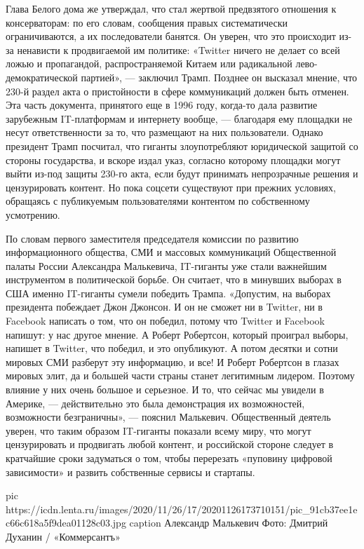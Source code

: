Глава Белого дома же утверждал, что стал жертвой предвзятого отношения к
консерваторам: по его словам, сообщения правых систематически ограничиваются, а
их последователи банятся. Он уверен, что это происходит из-за ненависти к
продвигаемой им политике: «Twitter ничего не делает со всей ложью и
пропагандой, распространяемой Китаем или радикальной лево-демократической
партией», — заключил Трамп. Позднее он высказал мнение, что 230-й раздел акта о
пристойности в сфере коммуникаций должен быть отменен. Эта часть документа,
принятого еще в 1996 году, когда-то дала развитие зарубежным IT-платформам и
интернету вообще, — благодаря ему площадки не несут ответственности за то, что
размещают на них пользователи. Однако президент Трамп посчитал, что гиганты
злоупотребляют юридической защитой со стороны государства, и вскоре издал указ,
согласно которому площадки могут выйти из-под защиты 230-го акта, если будут
принимать непрозрачные решения и цензурировать контент. Но пока соцсети
существуют при прежних условиях, обращаясь с публикуемым пользователями
контентом по собственному усмотрению.

По словам первого заместителя председателя комиссии по развитию информационного
общества, СМИ и массовых коммуникаций Общественной палаты России Александра
Малькевича, IT-гиганты уже стали важнейшим инструментом в политической борьбе.
Он считает, что в минувших выборах в США именно IT-гиганты сумели победить
Трампа. «Допустим, на выборах президента побеждает Джон Джонсон. И он не сможет
ни в Twitter, ни в Facebook написать о том, что он победил, потому что Twitter
и Facebook напишут: у нас другое мнение. А Роберт Робертсон, который проиграл
выборы, напишет в Twitter, что победил, и это опубликуют. А потом десятки и
сотни мировых СМИ разберут эту информацию, и все! И Роберт Робертсон в глазах
мировых элит, да и большей части страны станет легитимным лидером. Поэтому
влияние у них очень большое и серьезное. И то, что сейчас мы увидели в Америке,
— действительно это была демонстрация их возможностей, возможности
безграничны», — пояснил Малькевич. Общественный деятель уверен, что таким
образом IT-гиганты показали всему миру, что могут цензурировать и продвигать
любой контент, и российской стороне следует в кратчайшие сроки задуматься о
том, чтобы перерезать «пуповину цифровой зависимости» и развить собственные
сервисы и стартапы.

\ifcmt
pic https://icdn.lenta.ru/images/2020/11/26/17/20201126173710151/pic_91cb37ee1ec66c618a5f9dea01128c03.jpg
caption Александр Малькевич Фото: Дмитрий Духанин / «Коммерсантъ»
\fi

